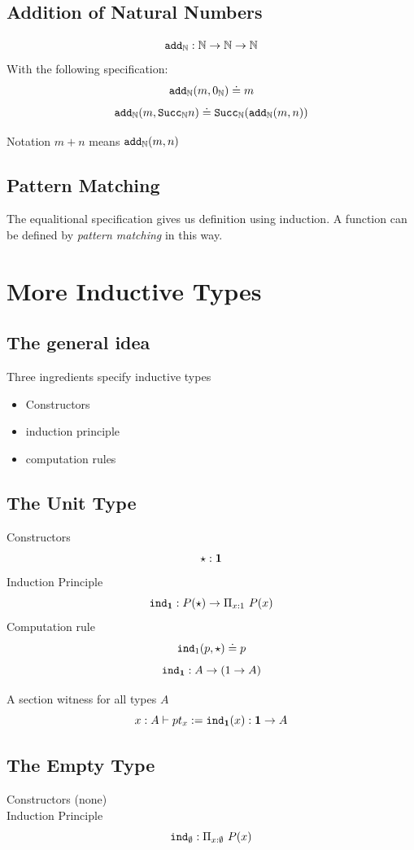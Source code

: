 \documentclass{article}
\begin{document}
\subsection{Addition of Natural Numbers}

\begin{definition}[$\AddNat(m,n)$]
  \[ \texttt{add}_{\mathbb{N}} : \mathbb{N} \to \mathbb{N} \to \mathbb{N} \]
  With the following specification:
  \[ \texttt{add}_{\mathbb{N}} (m, 0_{\mathbb{N}}) \doteq m \]
  \[ \texttt{add}_{\mathbb{N}} (m, \texttt{Succ}_{\mathbb{N}} n) \doteq \texttt{Succ}_{\mathbb{N}} (\texttt{add}_{\mathbb{N}} (m, n)) \]

  Notation $m + n$ means $\AddNat (m, n)$
\end{definition}


\subsection{Pattern Matching}
The equalitional specification gives us definition using induction.
A function can be defined by \emph{pattern matching} in this way.



\section{More Inductive Types}
\subsection{The general idea}
Three ingredients specify inductive types
\begin{itemize}
\item Constructors
\item induction principle
\item computation rules
\end{itemize}

\subsection{The Unit Type}
\begin{definition}
  Constructors
    \[ \mathord\star : \textbf{1} \]
  Induction Principle
    \[\texttt{ind}_{\textbf{1}} : P(\mathord\star) \to \Pi_{x : 1}~ {P}(x) \]
    Computation rule
    \[ \texttt{ind}_{1}(p, \mathord\star) \doteq p \]
    \[ \texttt{ind}_{\textbf{1}}  : A \to (1 \to A) \]
  \end{definition}

 A section witness for all types $A$
\[ x : A \vdash pt_x := \texttt{ind}_{\textbf{1}}(x) : \textbf{1} \to A \]

\subsection{The Empty Type}
\begin{definition}
  Constructors (none)\\

  Induction Principle
  \[\texttt{ind}_\emptyset : \Pi_{x : \emptyset}~ {P} (x) \]
\end{definition}
\end{document}
